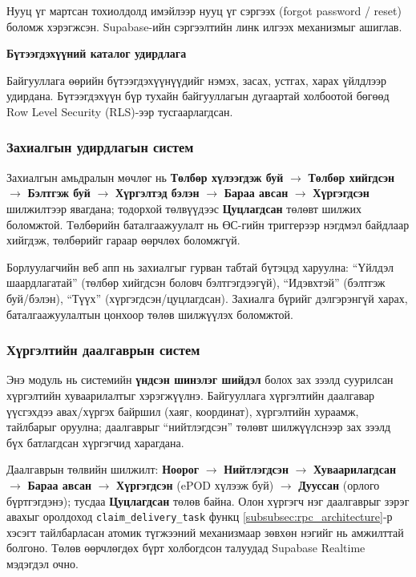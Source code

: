 Нууц үг мартсан тохиолдолд имэйлээр нууц үг сэргээх (forgot password / reset) боломж хэрэгжсэн. Supabase-ийн сэргээлтийн линк илгээх механизмыг ашиглав.

\textbf{Бүтээгдэхүүний каталог удирдлага}

Байгууллага өөрийн бүтээгдэхүүнүүдийг нэмэх, засах, устгах, харах үйлдлээр удирдана. Бүтээгдэхүүн бүр тухайн байгууллагын дугаартай холбоотой бөгөөд Row Level Security (RLS)-ээр тусгаарлагдсан.

\subsubsection{Захиалгын удирдлагын систем}

Захиалгын амьдралын мөчлөг нь \textbf{Төлбөр хүлээгдэж буй} $\rightarrow$ \textbf{Төлбөр хийгдсэн} $\rightarrow$ \textbf{Бэлтгэж буй} $\rightarrow$ \textbf{Хүргэлтэд бэлэн} $\rightarrow$ \textbf{Бараа авсан} $\rightarrow$ \textbf{Хүргэгдсэн} шилжилтээр явагдана; тодорхой төлвүүдээс \textbf{Цуцлагдсан} төлөвт шилжих боломжтой. Төлбөрийн баталгаажуулалт нь ӨС-гийн триггерээр нэгдмэл байдлаар хийгдэж, төлбөрийг гараар өөрчлөх боломжгүй.

Борлуулагчийн веб апп нь захиалгыг гурван табтай бүтэцэд харуулна: ``Үйлдэл шаардлагатай'' (төлбөр хийгдсэн боловч бэлтгэгдээгүй), ``Идэвхтэй'' (бэлтгэж буй/бэлэн), ``Түүх'' (хүргэгдсэн/цуцлагдсан). Захиалга бүрийг дэлгэрэнгүй харах, баталгаажуулалтын цонхоор төлөв шилжүүлэх боломжтой.

\subsubsection{Хүргэлтийн даалгаврын систем}

Энэ модуль нь системийн \textbf{үндсэн шинэлэг шийдэл} болох зах зээлд суурилсан хүргэлтийн хуваарилалтыг хэрэгжүүлнэ. Байгууллага хүргэлтийн даалгавар үүсгэхдээ авах/хүргэх байршил (хаяг, координат), хүргэлтийн хураамж, тайлбарыг оруулна; даалгаврыг ``нийтлэгдсэн'' төлөвт шилжүүлснээр зах зээлд бүх батлагдсан хүргэгчид харагдана.

Даалгаврын төлвийн шилжилт: \textbf{Ноорог} $\rightarrow$ \textbf{Нийтлэгдсэн} $\rightarrow$ \textbf{Хуваарилагдсан} $\rightarrow$ \textbf{Бараа авсан} $\rightarrow$ \textbf{Хүргэгдсэн} (ePOD хүлээж буй) $\rightarrow$ \textbf{Дууссан} (орлого бүртгэгдэнэ); тусдаа \textbf{Цуцлагдсан} төлөв байна. Олон хүргэгч нэг даалгаврыг зэрэг авахыг оролдоход \texttt{claim\_delivery\_task} функц \ref{subsubsec:rpc_architecture}-р хэсэгт тайлбарласан атомик түгжээний механизмаар зөвхөн нэгийг нь амжилттай болгоно. Төлөв өөрчлөгдөх бүрт холбогдсон талуудад Supabase Realtime мэдэгдэл очно.

